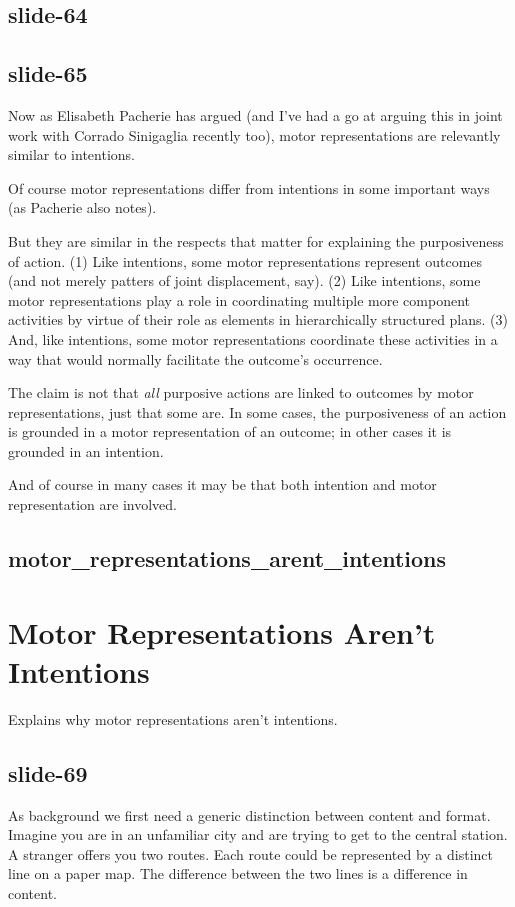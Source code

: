 \documentclass[12pt,\papersize]{extarticle}
\begin{document}
\subsection{slide-64}

\subsection{slide-65}
Now as Elisabeth Pacherie has argued (and I’ve had a go at arguing this in joint work with Corrado Sinigaglia recently too),
motor representations are relevantly similar to intentions.

Of course motor representations differ from intentions in some important ways (as Pacherie also notes).

But they are similar in the respects that matter for explaining the purposiveness of action.
(1) Like intentions, some motor representations represent outcomes (and not merely patters of joint displacement, say).
(2) Like intentions, some motor representations play a role in coordinating multiple more component activities by virtue of their role as elements in hierarchically structured plans.
(3) And, like intentions, some motor representations coordinate these activities in a way that would normally facilitate the outcome’s occurrence.

The claim is not that \emph{all} purposive actions are linked to outcomes by motor representations, just that some are.
In some cases, the purposiveness of an action is grounded in a motor representation of an outcome; in other cases it is grounded in an intention.

And of course in many cases it may be that both intention and motor representation are involved.

\subsection{motor\_representations\_arent\_intentions}


\section{Motor Representations Aren’t Intentions}

Explains why motor representations aren’t intentions.

\subsection{slide-69}
As background we first need a generic distinction between content and format.
Imagine you are in an unfamiliar city and are trying to get to the central station.
A stranger offers you two routes. Each route could be represented by a distinct line
on a paper map. The difference between the two lines is a difference in content.
\end{document}
